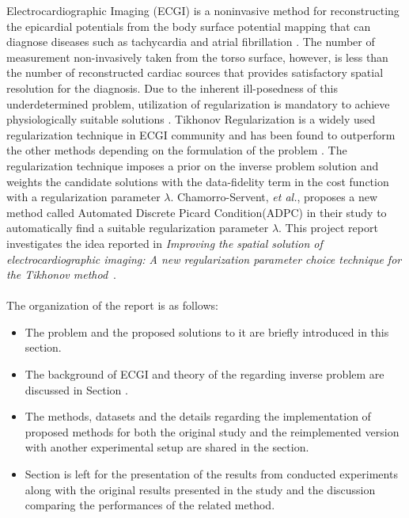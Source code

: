 \documentclass[draftcls, onecolumn, journal]{IEEEtran}
\begin{document}
\indent Electrocardiographic Imaging (ECGI) is a noninvasive method for reconstructing the epicardial potentials from the body surface potential mapping that can diagnose diseases such as tachycardia \cite{intini2005electrocardiographic} and atrial fibrillation \cite{figuera2016regularization,schuler2017ecg}. The number of measurement non-invasively taken from the torso surface, however, is less than the number of reconstructed cardiac sources that provides satisfactory spatial resolution for the diagnosis. Due to the inherent ill-posedness of this underdetermined problem, utilization of regularization is mandatory to achieve physiologically suitable solutions \cite{milanivc2014assessment}. Tikhonov Regularization is a widely used regularization technique in ECGI community and has been found to outperform the other methods depending on the formulation of the problem \cite*{milanivc2014assessment}. The regularization technique imposes a prior on the inverse problem solution and weights the candidate solutions with the data-fidelity term in the cost function with a regularization parameter $\lambda$. Chamorro-Servent, \textit{et al.}, proposes a new method called Automated Discrete Picard Condition(ADPC) in their study \cite*{chamorro2017improving} to automatically find a suitable regularization parameter $\lambda$. 
This project report investigates the idea reported in \textit{Improving the spatial solution of electrocardiographic
imaging: A new regularization parameter choice technique for the Tikhonov method}~\cite{chamorro2017improving}.  
\\
\\
The organization of the report is as follows:
\begin{itemize}
    \item The problem and the proposed solutions to it are briefly introduced in this section.
    \item The background of ECGI and theory of the regarding inverse problem are discussed in Section .
    \item The methods, datasets and the details regarding the implementation of proposed methods for both the original study and the reimplemented version with another experimental setup are shared in the  section.
    \item Section  is left for the presentation of the results from conducted experiments along with the original results presented in the study and the discussion comparing the performances of the related method.
\end{itemize}
\end{document}
